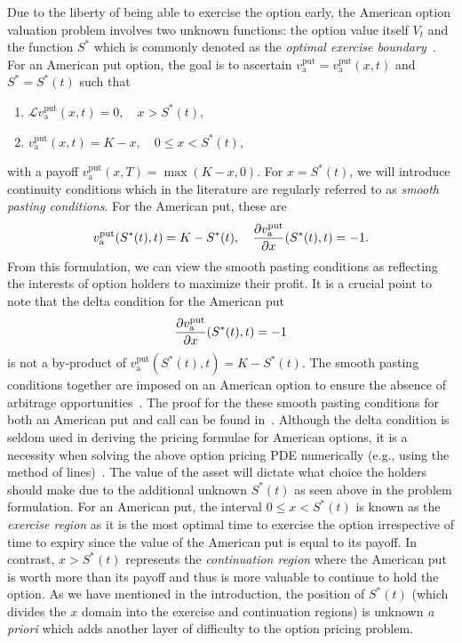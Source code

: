 Due to the liberty of being able to exercise the option early, the American option valuation problem involves two unknown functions: the option value itself $V_t$ and
the function $S^*$ which is commonly denoted as the \emph{optimal exercise boundary}~\cite{Kwok2008}. For an American put option, the goal is to ascertain
$v_\text{a}^{\text{put}} =v_\text{a}^{\text{put}}(x,t)$ and $S^* = S^*(t)$ such that
	\begin{enumerate}
			\item $\mathscr{L}v_\text{a}^{\text{put}}(x,t) = 0, \quad x > S^*(t)$,
			\item $v_\text{a}^{\text{put}}(x,t) = K - x, \quad 0 \leq x < S^*(t)$,
	\end{enumerate}
	with a payoff $v_\text{a}^{\text{put}}(x,T) = \max(K-x,0)$. For $x = S^*(t)$, we will introduce continuity conditions which in the literature are regularly referred to as \emph{smooth pasting conditions}. For the American put, these are
		\begin{equation*}
			v_\text{a}^{\text{put}}(S^*(t),t) = K - S^*(t), \quad \frac{\partial v_\text{a}^{\text{put}}}{\partial x}(S^*(t),t) = -1.
		\end{equation*}
	From this formulation, we can view the smooth pasting conditions as reflecting the interests of option holders to maximize their profit. It is a crucial point to note that the delta condition for the American put
	$$
	\frac{\partial v_\text{a}^{\text{put}}}{\partial x}(S^*(t),t) = -1
	$$
is not a by-product of $v_\text{a}^{\text{put}}(S^*(t),t) = K - S^*(t)$. The smooth pasting conditions together are imposed on an American option to ensure the absence of arbitrage opportunities~\cite{Chiarella2014}. The proof for the these smooth pasting conditions for both an American put and call can be found in~\cite{Chin2017}. Although the delta condition is seldom used in deriving the pricing formulae for American options, it is a necessity when solving the above option pricing PDE numerically (e.g., using the method of lines)~\cite{Chiarella2010}. The value of the asset will dictate what choice the holders should make due to the additional unknown $S^*(t)$ as seen above in the problem formulation. For an American put, the interval $0 \leq x < S^*(t)$ is known as the \emph{exercise region} as it is the most optimal time to exercise the option irrespective of time to expiry since the value of the American put is equal to its payoff. In contrast, $x > S^*(t)$ represents the \emph{continuation region} where the American put is worth more than its payoff and thus is more valuable to continue to hold the option. As we have mentioned in the introduction, the position of $S^*(t)$ (which divides the $x$ domain into the exercise and continuation regions) is unknown \emph{a priori} which adds another layer of difficulty to the option pricing problem.
	
